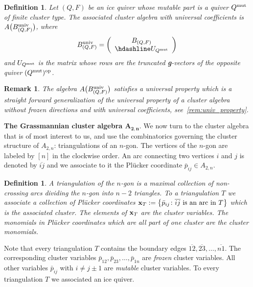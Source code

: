\documentclass[10pt,a4paper]{amsart}
\newcommand{\thlabel}[1]{\label{#1}}
\newcommand{\thref}[1]{\ref{#1}}
\newtheorem{Definition}[Theorem]{Definition}
\newtheorem{Remark}[Theorem]{Remark}}
\numberwithin{equation}{section}
\begin{document}
\begin{Definition}\thlabel{def:univ frozen}
Let $(Q,F)$ be an ice quiver whose mutable part is a quiver $Q^{\rm mut}$ of finite cluster type. The {\it associated cluster algebra with universal coefficients} is $A\big(B_{(Q,F)}^{{\rm univ}}\big)$, where
\begin{displaymath}
B^{{\rm univ}}_{(Q,F)}=
\left(
\begin{array}{c}
 B_{(Q,F)} \\ \hdashline
 U_{Q^{\rm mut}}
\end{array}
\right)
\end{displaymath}
and $U_{Q^{\rm mut}}$ is the matrix whose rows are the truncated {\bf g}-vectors of the opposite quiver $(Q^{\rm mut})^{\rm op}$.
\end{Definition}

\begin{Remark}
The algebra $A\big(B_{(Q,F)}^{{\rm univ}}\big)$ satisfies a universal property which is a straight forward generalization of the universal property of a cluster algebra without frozen directions and with universal coefficients, see~\thref{rem:univ_property}.
\end{Remark}


\noindent
{\bf The Grassmannian cluster algebra $\boldsymbol{A_{2,n}}$}. We now turn to the cluster algebra that is of most interest to us, and use the combinatorics governing the cluster structure of $A_{2,n}$: triangulations of an $n$-gon. The vertices of the $n$-gon are labeled by $[n]$ in the clockwise order.
An arc connecting two vertices $i$ and $j$ is denoted by $\overline{ij}$ and we associate to it the Pl\"ucker coordinate $\bar p_{ij}\in A_{2,n}$.

\begin{Definition}\thlabel{def:triang}
A {\it triangulation} of the $n$-gon is a maximal collection of non-crossing arcs dividing the $n$-gon into $n-2$ triangles.
To a triangulation $T$ we associate a collection of Pl\"ucker coordinates ${\bf x}_T:=\big\{\bar p_{ij} \colon \overline{ij} \text{ is an arc in }T\big\}$ which is the associated {\it cluster}.
The elements of ${\bf x}_T$ are the {\it cluster variables}.
The monomials in Pl\"ucker coordinates which are all part of one cluster are the {\it cluster monomials}.
\end{Definition}

Note that every triangulation $T$ contains the boundary edges $\overline{12},\overline{23},\dots,\overline{n1}$.
The correspon\-ding cluster variables $\bar p_{12},\bar p_{23},\dots,\bar p_{1n}$ are {\it frozen} cluster variables.
All other variables $\bar p_{ij}$ with $i\not=j\pm 1$ are {\it mutable} cluster variables.
To every triangulation $T$ we associated an ice quiver.
\end{document}
